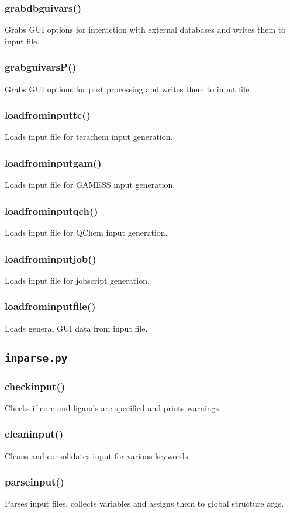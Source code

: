 \documentclass[a4paper,12pt]{assignment}
\begin{document}
\subsubsection{grabdbguivars()}
Grabs GUI options for interaction with external databases and writes them to input file.
\subsubsection{grabguivarsP()}
Grabs GUI options for post processing and writes them to input file.
\subsubsection{loadfrominputtc()}
Loads input file for terachem input generation.
\subsubsection{loadfrominputgam()}
Loads input file for GAMESS input generation.
\subsubsection{loadfrominputqch()}
Loads input file for QChem input generation.
\subsubsection{loadfrominputjob()}
Loads input file for jobscript generation.
\subsubsection{loadfrominputfile()}
Loads general GUI data from input file.

\subsection{\texttt{inparse.py}}
\subsubsection{checkinput()}
Checks if core and ligands are specified and prints warnings.
\subsubsection{cleaninput()}
Cleans and consolidates input for various keywords.
\subsubsection{parseinput()}
Parses input files, collects variables and assigns them to global structure args.
\end{document}
